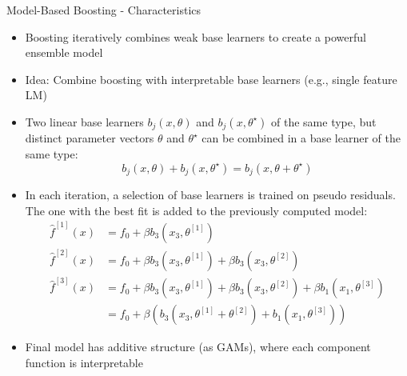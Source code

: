\documentclass[11pt,compress,t,notes=noshow, aspectratio=169, xcolor=table]{beamer}
\begin{document}
\begin{frame}{Model-Based Boosting - Characteristics}

\begin{itemize}
\item
Boosting iteratively combines weak base learners to create a powerful ensemble model
\item
Idea: Combine boosting with interpretable base learners (e.g., single feature LM) 
\item
Two linear base learners $b_j(x, \theta)$ and $b_j(x, \theta^{\star})$ of the same type, but distinct parameter vectors $\theta$ and $\theta^{\star}$ can be combined in a base learner of the same type:
$$
b_j(x, \theta) + b_j(x, \theta^{\star}) = b_j(x, \theta + \theta^{\star})
$$
\item In each iteration, a selection of base learners is trained on pseudo residuals. The one with the best fit is added to the previously computed model:
\medskip
\begin{align*}
\widehat{f}^{[1]}(x) &= f_0 + \beta b_3(x_3, \theta^{[1]}) \\
\widehat{f}^{[2]}(x) &= f_0 + \beta b_3(x_3, \theta^{[1]}) + \beta b_3(x_3, \theta^{[2]})\\
\widehat{f}^{[3]}(x) &= f_0 + \beta b_3(x_3, \theta^{[1]}) + \beta b_3(x_3, \theta^{[2]}) + \beta b_1(x_1, \theta^{[3]}) \\
&= f_0 + \beta \left(b_3(x_3, \theta^{[1]} + \theta^{[2]}) + b_1(x_1, \theta^{[3]})\right)
\end{align*}

\item Final model has additive structure (as GAMs), where each component function is interpretable

\end{itemize}
\end{frame}
\end{document}
